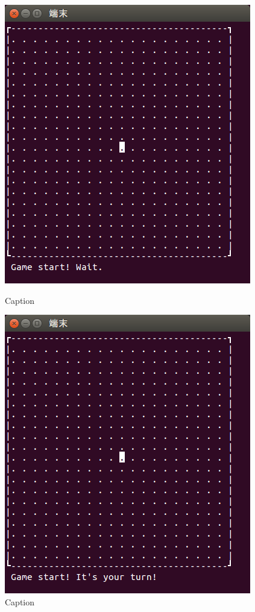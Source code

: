 \documentclass[a4j, titlepage, 10pt]{jsarticle}
\begin{document}
\begin{figure}[H]
  \begin{minipage}{0.5\hsize}
    \centering
    \includegraphics[scale=0.5]{img/game-start1.png}
    \caption{Caption}
    \label{fig:game-start1.png}
  \end{minipage}
  \begin{minipage}{0.5\hsize}
    \includegraphics[scale=0.5]{img/game-start2.png}
    \caption{Caption}
    \label{fig:game-start2.png}
  \end{minipage}
\end{figure}
\end{document}
